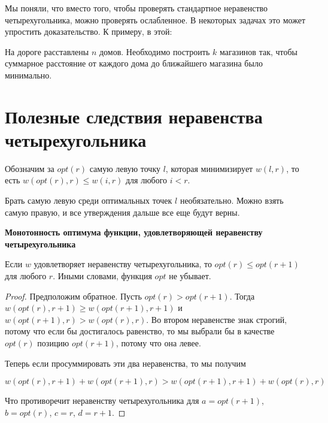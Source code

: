 Мы поняли, что вместо того, чтобы проверять стандартное неравенство четырехугольника, можно проверять ослабленное. В некоторых задачах это может упростить доказательство. К примеру, в этой:

\begin{problem}
    На дороге расставлены $n$ домов. Необходимо построить $k$ магазинов так, чтобы суммарное расстояние от каждого дома до ближайшего магазина было минимально.
\end{problem}


\section{Полезные следствия неравенства четырехугольника}


\begin{designation}
Обозначим за $opt(r)$ самую левую точку $l$, которая минимизирует $w(l, r)$, то есть $w(opt(r), r) \le w(i, r)$ для любого $i < r$.
\end{designation}

\begin{observation}
    Брать самую левую среди оптимальных точек $l$ необязательно. Можно взять самую правую, и все утверждения дальше все еще будут верны.
\end{observation}

\begin{proposition} \textbf{Монотонность оптимума функции, удовлетворяющей неравенству четырехугольника}

    Если $w$ удовлетворяет неравенству четырехугольника, то $opt(r) \le opt(r + 1)$ для любого $r$. Иными словами, функция $opt$ не убывает.
\end{proposition}

\begin{proof}
    Предположим обратное. Пусть $opt(r) > opt(r + 1)$. Тогда $w(opt(r), r + 1) \ge w(opt(r + 1), r + 1)$ и $w(opt(r + 1), r) > w(opt(r), r)$. Во втором неравенстве знак строгий, потому что если бы достигалось равенство, то мы выбрали бы в качестве $opt(r)$ позицию $opt(r + 1)$, потому что она левее.

    Теперь если просуммировать эти два неравенства, то мы получим

    $$w(opt(r), r + 1) + w(opt(r + 1), r) > w(opt(r + 1), r + 1) + w(opt(r), r)$$

    Что противоречит неравенству четырехугольника для $a = opt(r + 1)$, $b = opt(r)$, $c = r$, $d = r + 1$.
\end{proof}


